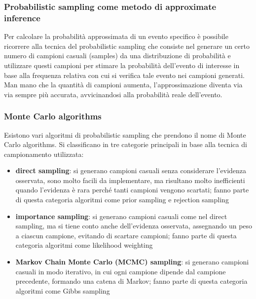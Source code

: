 \subsubsection*{Probabilistic sampling come metodo di approximate inference}
Per calcolare la probabilità approssimata di un evento specifico è possibile ricorrere alla tecnica del probabilistic sampling
che consiste nel generare un certo numero di campioni casuali (samples) da una distribuzione di probabilità e utilizzare
questi campioni per stimare la probabilità dell'evento di interesse in base alla frequenza relativa con cui si verifica
tale evento nei campioni generati. Man mano che la quantità di campioni aumenta, l'approssimazione diventa via via sempre
più accurata, avvicinandosi alla probabilità reale dell'evento.

\subsubsection*{Monte Carlo algorithms}
Esistono vari algoritmi di probabilistic sampling che prendono il nome di Monte Carlo algorithms. Si classificano in tre
categorie principali in base alla tecnica di campionamento utilizzata:
\begin{itemize}
	\item \textbf{direct sampling}: si generano campioni casuali senza considerare l'evidenza osservata, sono molto facili
	da implementare, ma risultano molto inefficienti quando l'evidenza è rara perché tanti campioni vengono scartati; fanno
	parte di questa categoria algoritmi come prior sampling e rejection sampling
	\item \textbf{importance sampling}: si generano campioni casuali come nel direct sampling, ma si tiene conto anche
	dell'evidenza osservata, assegnando un peso a ciascun campione, evitando di scartare campioni; fanno parte di questa
	categoria algoritmi come likelihood weighting
	\item \textbf{Markov Chain Monte Carlo (MCMC) sampling}: si generano campioni casuali in modo iterativo, in cui ogni
	campione dipende dal campione precedente, formando una catena di Markov; fanno parte di questa categoria algoritmi
	come Gibbs sampling
\end{itemize}

